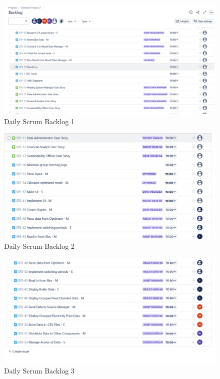 \documentclass[12pt]{report}
\begin{document}
\begin{figure}[H]
  \centering
  \includegraphics[width=1\textwidth]{Resources/2-Sprint/Daily-Scrum/backlog1.png}
  \caption{Daily Scrum Backlog 1}
  \label{fig:S2Scrum1-image}
\end{figure}

\begin{figure}[H]
  \centering
  \includegraphics[width=1\textwidth]{Resources/2-Sprint/Daily-Scrum/backlog2.png}
  \caption{Daily Scrum Backlog 2}
  \label{fig:S2Scrum2-image}
\end{figure}

\begin{figure}[H]
  \centering
  \includegraphics[width=1\textwidth]{Resources/2-Sprint/Daily-Scrum/backlog3.png}
  \caption{Daily Scrum Backlog 3}
  \label{fig:S2Scrum3-image}
\end{figure}
\end{document}
